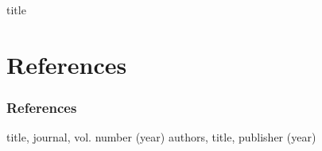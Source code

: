 \documentclass[10pt]{beamer}
\begin{document}
\section{}
\begin{frame}
\vfill
\centering
\begin{beamercolorbox}[sep=8pt,center,shadow=true,rounded=true]{title}
\end{beamercolorbox}
\vfill
\end{frame}

\section{References}
\begin{frame}[allowframebreaks=1]
\frametitle{References}
\small

\begin{thebibliography}{0.2}
{title, journal, vol. number (year)}
authors, {title, publisher (year)}
\end{thebibliography}
\end{frame}
\end{document}
